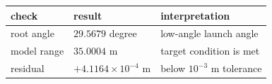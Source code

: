 \documentclass[border=12pt]{standalone}
\begin{document}
\color{weeknavy}
\renewcommand{\arraystretch}{1.55}
\begin{tabular}{>{\raggedright\arraybackslash}m{4.2cm} >{\centering\arraybackslash}m{4.7cm} >{\raggedright\arraybackslash}m{5.4cm}}
\toprule
\textbf{check} & \textbf{result} & \textbf{interpretation}\\
\midrule
root angle & $29.5679$ degree & low-angle launch angle\\
model range & $35.0004$ m & target condition is met\\
residual & $+4.1164\times10^{-4}$ m & below $10^{-3}$ m tolerance\\
\bottomrule
\end{tabular}
\end{document}
